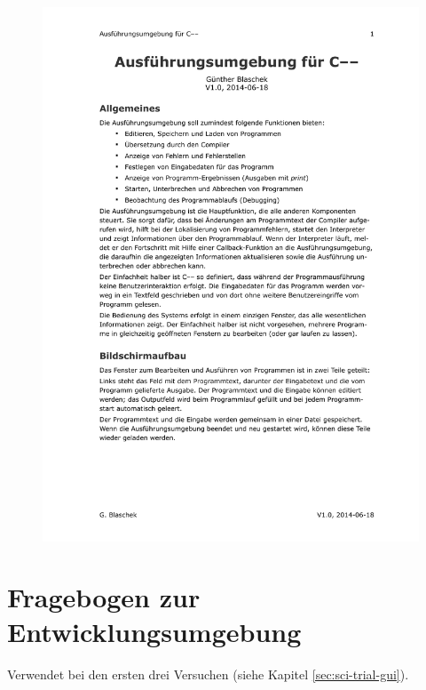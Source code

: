 \documentclass[11pt, oneside]{book}   		%
\begin{document}
\begin{figure}[h!]
	\centering
	\includegraphics[width=1.0\textwidth]{./media/docs/Anforderung-gui.pdf}
\end{figure}



\pagebreak
\section{Fragebogen zur Entwicklungsumgebung}
Verwendet bei den ersten drei Versuchen (siehe Kapitel \ref{sec:sci-trial-gui}).
\end{document}
